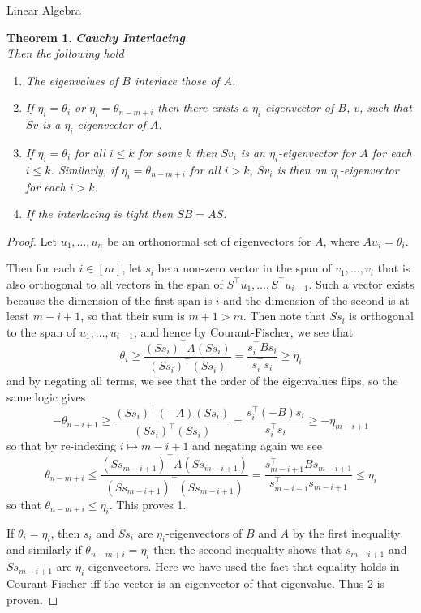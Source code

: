 \documentclass{article}
\newtheorem{thm}{Theorem}
\begin{document}
\begin{section}{Linear Algebra}
\begin{thm}{\textbf{Cauchy Interlacing}\\}
    Then the following hold
    \begin{enumerate}
      \item
	The eigenvalues of $B$ interlace those of $A$.
      \item
	If $\eta_i = \theta_i$ or $\eta_i = \theta_{n-m+i}$ then there exists a $\eta_i$-eigenvector of $B$, $v$, such that $Sv$ is a $\eta_i$-eigenvector of $A$.
      \item
	If $\eta_i = \theta_i$ for all $i \leq k$ for some $k$ then $Sv_i$ is an $\eta_i$-eigenvector for $A$ for each $i \leq k$.
	Similarly, if $\eta_i = \theta_{n-m+i}$ for all $i > k$, $Sv_i$ is then an $\eta_i$-eigenvector for each $i > k$.
      \item
	If the interlacing is tight then $SB = AS$.
    \end{enumerate}
  \end{thm}
  \begin{proof}
    Let $u_1, \ldots, u_n$ be an orthonormal set of eigenvectors for $A$, where $Au_i = \theta_i$.

    Then for each $i \in [m]$, let $s_i$ be a non-zero vector in the span of $v_1, \ldots, v_i$ that is also orthogonal to all vectors in the span of $S^\intercal u_1, \ldots, S^\intercal u_{i-1}$.
    Such a vector exists because the dimension of the first span is $i$ and the dimension of the second is at least $m-i+1$, so that their sum is $m+1 > m$.
    Then note that $Ss_i$ is orthogonal to the span of $u_1, \ldots, u_{i-1}$, and hence by Courant-Fischer, we see that
    $$
    \theta_i \geq \frac{(Ss_i)^\intercal A (Ss_i)}{(Ss_i)^\intercal(Ss_i)} = \frac{s_i^\intercal B s_i}{s_i^\intercal s_i} \geq \eta_i
    $$
    and by negating all terms, we see that the order of the eigenvalues flips, so the same logic gives
    $$
    -\theta_{n-i+1} \geq \frac{(Ss_i)^\intercal(-A)(Ss_i)}{(Ss_i)^\intercal(Ss_i)} = \frac{s_i^\intercal(-B)s_i}{s_i^\intercal s_i} \geq -\eta_{m-i+1}
    $$
    so that by re-indexing $i \mapsto m-i+1$ and negating again we see
    $$
    \theta_{n-m+i} \leq \frac{(Ss_{m-i+1})^\intercal A(Ss_{m-i+1})}{(Ss_{m-i+1})^\intercal(Ss_{m-i+1})} = \frac{s_{m-i+1}^\intercal Bs_{m-i+1}}{s_{m-i+1}^\intercal s_{m-i+1}} \leq \eta_{i}
    $$
    so that
    $\theta_{n-m+i} \leq \eta_i$.
    This proves 1.

    If $\theta_i = \eta_i$, then $s_i$ and $Ss_i$ are $\eta_i$-eigenvectors of $B$ and $A$ by the first inequality and similarly if $\theta_{n-m+i} = \eta_i$ then the second inequality shows that $s_{m-i+1}$ and $Ss_{m-i+1}$ are $\eta_i$ eigenvectors.
    Here we have used the fact that equality holds in Courant-Fischer iff the vector is an eigenvector of that eigenvalue.
    Thus 2 is proven.


\end{proof}
\end{section}
\end{document}

